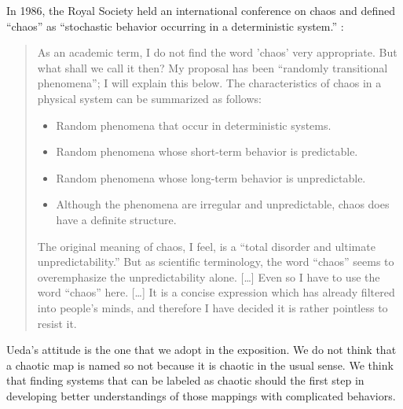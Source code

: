 \documentclass[10pt,twoside,draft]{book}
\begin{document}
In 1986, the Royal Society held an international conference on chaos and defined ``chaos'' as ``stochastic behavior occurring in a deterministic system.'' \cite{stewart}
\citet[24]{ueda-abraham}:
\begin{quotation}
  As an academic term, I do not find the word 'chaos' very appropriate.
  But what shall we call it then?
  My proposal has been ``randomly transitional phenomena''; I will explain this below.
  The characteristics of chaos in a physical system can be summarized as follows:
  \begin{itemize}
    \item Random phenomena that occur in deterministic systems.
    \item Random phenomena whose short-term behavior is predictable.
    \item Random phenomena whose long-term behavior is unpredictable.
    \item Although the phenomena are irregular and unpredictable, chaos does have a definite structure.
  \end{itemize}
  The original meaning of chaos, I feel, is a ``total disorder and ultimate unpredictability.''
  But as scientific terminology, the word ``chaos'' seems to overemphasize the unpredictability alone.
  [\ldots]
  Even so I have to use the word ``chaos'' here. [\ldots]
  It is a concise expression which has already filtered into people's minds, and therefore I have decided it is rather pointless to resist it.
\end{quotation}
Ueda's attitude is the one that we adopt in the exposition.
We do not think that a chaotic map is named so not because it is chaotic in the usual sense.
We think that finding systems that can be labeled as chaotic should the first step in developing better understandings of those mappings with complicated behaviors.
\end{document}
